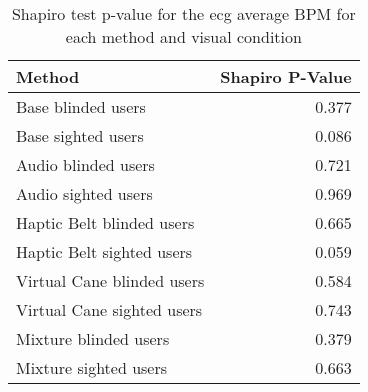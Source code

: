 
\begin{table}[!htb]
\centering
\caption{Shapiro test p-value for the ecg average BPM for each method and visual condition}
\label{tab:shapiro_ecg_bpm}
\begin{tabular}{lr}
\toprule
                    Method &  Shapiro P-Value \\
\midrule
        Base blinded users &            0.377 \\
        Base sighted users &            0.086 \\
       Audio blinded users &            0.721 \\
       Audio sighted users &            0.969 \\
 Haptic Belt blinded users &            0.665 \\
 Haptic Belt sighted users &            0.059 \\
Virtual Cane blinded users &            0.584 \\
Virtual Cane sighted users &            0.743 \\
     Mixture blinded users &            0.379 \\
     Mixture sighted users &            0.663 \\
\bottomrule
\end{tabular}
\end{table}

